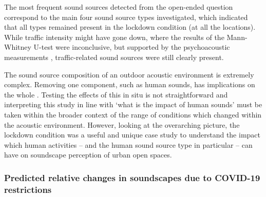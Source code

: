 \documentclass[
  authoryear,
  preprint,
  3p,
  onecolumn]{elsarticle}
\begin{document}
The most frequent sound sources detected from the open-ended question
correspond to the main four sound source types investigated, which
indicated that all types remained present in the lockdown condition (at
all the locations). While traffic intensity might have gone down, where
the results of the Mann-Whitney U-test were inconclusive, but supported
by the psychoacoustic measurements \citep{Aletta2020Assessing},
traffic-related sound sources were still clearly present.

The sound source composition of an outdoor acoustic environment is
extremely complex. Removing one component, such as human sounds, has
implications on the whole \citep{Gordo2021Rapid}. Testing the effects of
this in situ is not straightforward and interpreting this study in line
with `what is the impact of human sounds' must be taken within the
broader context of the range of conditions which changed within the
acoustic environment. However, looking at the overarching picture, the
lockdown condition was a useful and unique case study to understand the
impact which human activities -- and the human sound source type in
particular -- can have on soundscape perception of urban open spaces.

\hypertarget{predicted-relative-changes-in-soundscapes-due-to-covid-19-restrictions}{%
\subsubsection{Predicted relative changes in soundscapes due to COVID-19
restrictions}\label{predicted-relative-changes-in-soundscapes-due-to-covid-19-restrictions}}
\end{document}
